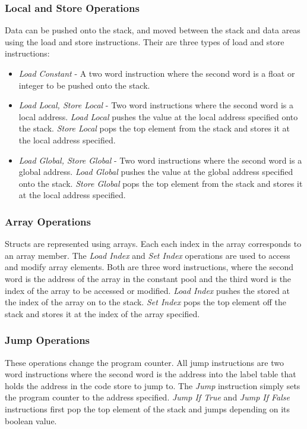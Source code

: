 \documentclass{l3proj}
\begin{document}
\subsubsection{Local and Store Operations}
Data can be pushed onto the stack, and moved between the stack and data areas using the load and store instructions. Their are three types of load and store instructions:
\begin{itemize}
	\item\textit{Load Constant} - A two word instruction where the second word is a float or integer to be pushed onto the stack.
	\item\textit{Load Local, Store Local} - Two word instructions where the second word is a local address. \textit{Load Local} pushes the value at the local address specified onto the stack. \textit{Store Local} pops the top element from the stack and stores it at the local address specified.
	\item\textit{Load Global, Store Global} - Two word instructions where the second word is a global address. \textit{Load Global} pushes the value at the global address specified onto the stack. \textit{Store Global} pops the top element from the stack and stores it at the local address specified.
\end{itemize}

\subsubsection{Array Operations}
Structs are represented using arrays. Each each index in the array corresponds to an array member. The \textit{Load Index} and \textit{Set Index} operations are used to access and modify array elements. Both are three word instructions, where the second word is the address of the array in the constant pool and the third word is the index of the array to be accessed or modified. \textit{Load Index} pushes the stored at the index of the array on to the stack. \textit{Set Index} pops the top element off the stack and stores it at the index of the array specified.

\subsubsection{Jump Operations}
These operations change the program counter. All jump instructions are two word instructions where the second word is the address into the label table that holds the address in the code store to jump to. The \textit{Jump} instruction simply sets the program counter to the address specified. \textit{Jump If True} and \textit{Jump If False} instructions first pop the top element of the stack and jumps depending on its boolean value.
\end{document}

